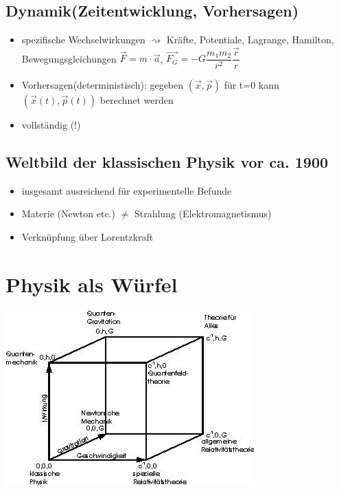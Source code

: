 				\subsection{Dynamik(Zeitentwicklung, Vorhersagen)}
					\begin{itemize}
						\item spezifische Wechselwirkungen $\rightsquigarrow$ Kräfte, Potentiale, Lagrange, Hamilton,\\
						Bewegungsgleichungen $\vec{F}=m \cdot \vec{a}$, $\vec{F_G}=-G\dfrac{m_1m_2}{r^2}\dfrac{\vec{r}}{r}$
						\item Vorhersagen(deterministisch): gegeben $ (\vec{x},\vec{p})$ für t=0 kann $(\vec{x}(t), \vec{p}(t))$ berechnet werden
						\item vollständig (!)
					\end{itemize}


				\subsection{Weltbild der klassischen Physik vor ca. 1900}
					\begin{itemize}
						\item insgesamt ausreichend für experimentelle Befunde
						\item Materie (Newton etc.) $\neq$ Strahlung (Elektromagnetismus)
						\item Verknüpfung über Lorentzkraft
					\end{itemize}

				\section{Physik als Würfel}
					\begin{center}
						\includegraphics[scale=2]{wurfel.jpg}
					\end{center}

